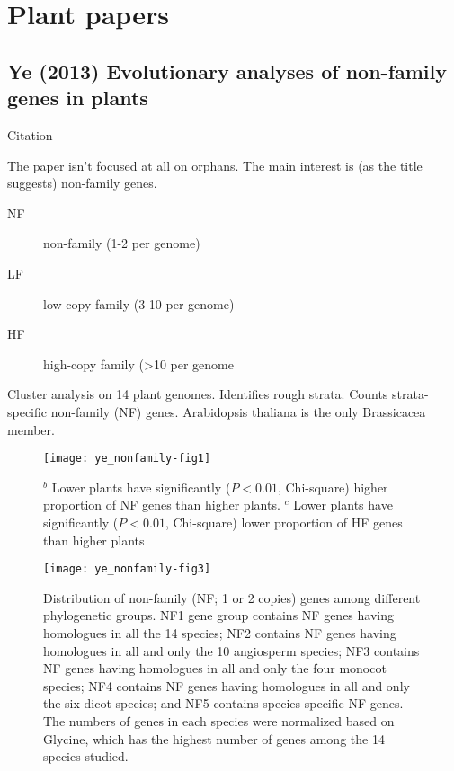 \section{Plant papers}
\subsection{Ye (2013) Evolutionary analyses of non-family genes in plants}

    Citation \cite{ye_evolutionary_2013}

    The paper isn't focused at all on orphans. The main interest is (as the
    title suggests) non-family genes.

    \begin{description} \item[NF] non-family (1-2 per genome) \item[LF]
            low-copy family (3-10 per genome) \item[HF] high-copy family
                (>10 per genome \end{description}

    Cluster analysis on 14 plant genomes. Identifies rough strata. Counts
    strata-specific non-family (NF) genes. Arabidopsis thaliana is the only
    Brassicacea member.

    \begin{figure}[h!] \centering \texttt{[image: ye\_nonfamily-fig1]}
        \caption{ ${}^b$ Lower plants have significantly ($P < 0.01$,
        Chi-square) higher proportion of NF genes than higher plants.
        ${}^c$ Lower plants have significantly ($P < 0.01$, Chi-square)
        lower proportion of HF genes than higher plants } \end{figure}

    \begin{figure}[h!] \centering \texttt{[image: ye\_nonfamily-fig3]}
        \caption{ Distribution of non-family (NF; 1 or 2 copies) genes
            among different phylogenetic groups. NF1 gene group contains NF
            genes having homologues in all the 14 species; NF2 contains NF
            genes having homologues in all and only the 10 angiosperm
            species; NF3 contains NF genes having homologues in all and
            only the four monocot species; NF4 contains NF genes having
            homologues in all and only the six dicot species; and NF5
            contains species-specific NF genes. The numbers of genes in
        each species were normalized based on Glycine, which has the
    highest number of genes among the 14 species studied.  } \end{figure}


